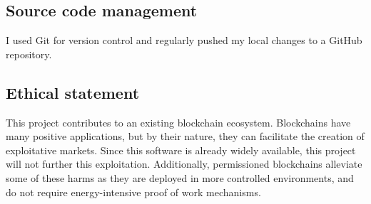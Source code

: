 \subsection{Source code management}
I used Git for version control and regularly pushed my local changes to a GitHub repository.

\subsection{Ethical statement}
This project contributes to an existing blockchain ecosystem. Blockchains have many positive applications, but by their nature, they can facilitate the creation of exploitative markets. Since this software is already widely available, this project will not further this exploitation. Additionally, permissioned blockchains alleviate some of these harms as they are deployed in more controlled environments, and do not require energy-intensive proof of work mechanisms.